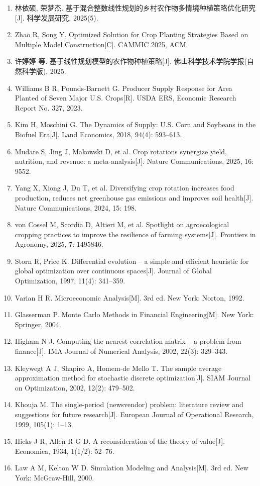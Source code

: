 \documentclass[12pt,a4paper]{article}
\begin{document}
\begingroup
\renewcommand{\labelenumi}{[\arabic{enumi}]}
\begin{enumerate}
  \item 林依硕, 荣梦杰. 基于混合整数线性规划的乡村农作物多情境种植策略优化研究[J]. 科学发展研究, 2025(5).
  \item Zhao R, Song Y. Optimized Solution for Crop Planting Strategies Based on Multiple Model Construction[C]. CAMMIC 2025, ACM.
  \item 许婷婷 等. 基于线性规划模型的农作物种植策略[J]. 佛山科学技术学院学报(自然科学版), 2025.
  \item Williams B R, Pounds-Barnett G. Producer Supply Response for Area Planted of Seven Major U.S. Crops[R]. USDA ERS, Economic Research Report No. 327, 2023.
  \item Kim H, Moschini G. The Dynamics of Supply: U.S. Corn and Soybeans in the Biofuel Era[J]. Land Economics, 2018, 94(4): 593--613.
  \item Mudare S, Jing J, Makowski D, et al. Crop rotations synergize yield, nutrition, and revenue: a meta-analysis[J]. Nature Communications, 2025, 16: 9552.
  \item Yang X, Xiong J, Du T, et al. Diversifying crop rotation increases food production, reduces net greenhouse gas emissions and improves soil health[J]. Nature Communications, 2024, 15: 198.
  \item von Cossel M, Scordia D, Altieri M, et al. Spotlight on agroecological cropping practices to improve the resilience of farming systems[J]. Frontiers in Agronomy, 2025, 7: 1495846.
  \item Storn R, Price K. Differential evolution -- a simple and efficient heuristic for global optimization over continuous spaces[J]. Journal of Global Optimization, 1997, 11(4): 341--359.
  \item Varian H R. Microeconomic Analysis[M]. 3rd ed. New York: Norton, 1992.
  \item Glasserman P. Monte Carlo Methods in Financial Engineering[M]. New York: Springer, 2004.
  \item Higham N J. Computing the nearest correlation matrix -- a problem from finance[J]. IMA Journal of Numerical Analysis, 2002, 22(3): 329--343.
  \item Kleywegt A J, Shapiro A, Homem-de Mello T. The sample average approximation method for stochastic discrete optimization[J]. SIAM Journal on Optimization, 2002, 12(2): 479--502.
  \item Khouja M. The single-period (newsvendor) problem: literature review and suggestions for future research[J]. European Journal of Operational Research, 1999, 105(1): 1--13.
  \item Hicks J R, Allen R G D. A reconsideration of the theory of value[J]. Economica, 1934, 1(1/2): 52--76.
  \item Law A M, Kelton W D. Simulation Modeling and Analysis[M]. 3rd ed. New York: McGraw-Hill, 2000.
\end{enumerate}
\endgroup
\end{document}
